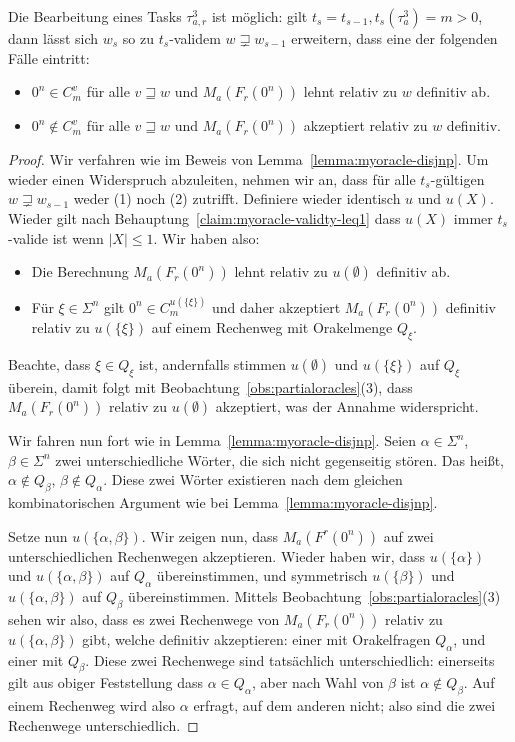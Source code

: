 \begin{lemma}\label{lemma:myoracle-up}
    Die Bearbeitung eines Tasks $\tau^3_{a,r}$ ist möglich: gilt $t_s=t_{s-1}, t_{s}(\tau^3_{a})=m>0$, dann lässt sich $w_{s}$ so zu $t_{s}$-validem $w\sqsupsetneq w_{s-1}$ erweitern, dass eine der folgenden Fälle eintritt:
        \begin{itemize}[nosep,endpenalty=10000]
            \item $0^n\in C_m^v$ für alle $v\sqsupseteq w$ und $M_a(F_r(0^n))$ lehnt relativ zu $w$ definitiv ab.
            \item $0^n\not\in C_m^v$ für alle $v\sqsupseteq w$ und $M_a(F_r(0^n))$ akzeptiert relativ zu $w$ definitiv.
        \end{itemize}
\end{lemma}
\begin{proof}
Wir verfahren wie im Beweis von Lemma~\ref{lemma:myoracle-disjnp}.
Um wieder einen Widerspruch abzuleiten, nehmen wir an, dass für alle $t_{s}$-gültigen $w\sqsupsetneq w_{s-1}$ weder (1) noch (2) zutrifft.
Definiere wieder identisch $u$ und $u(X)$.
Wieder gilt nach Behauptung~\ref{claim:myoracle-validty-leq1} dass $u(X)$ immer $t_{s}$-valide ist wenn $|X|\leq 1$.
Wir haben also:
\begin{itemize}[nosep]
    \item Die Berechnung $M_a(F_r(0^n))$ lehnt relativ zu $u(\emptyset)$ definitiv ab.
    \item Für $\xi\in \Sigma^{n}$ gilt $0^n\in C_m^{u(\{\xi\})}$ und daher akzeptiert $M_a(F_r(0^n))$ definitiv relativ zu $u(\{\xi\})$ auf einem Rechenweg mit Orakelmenge $Q_\xi$.
\end{itemize}

Beachte, dass $\xi\in Q_\xi$ ist, andernfalls stimmen $u(\emptyset)$ und $u(\{\xi\})$ auf $Q_\xi$ überein, damit folgt mit Beobachtung~\ref{obs:partialoracles}(3), dass $M_a(F_r(0^n))$ relativ zu $u(\emptyset)$ akzeptiert, was der Annahme widerspricht.

Wir fahren nun fort wie in Lemma~\ref{lemma:myoracle-disjnp}.
Seien $\alpha\in\Sigma^{n}$, $\beta\in\Sigma^{n}$ zwei unterschiedliche Wörter, die sich nicht gegenseitig stören. Das heißt, $\alpha\not\in Q_\beta$, $\beta\not\in Q_\alpha$.
Diese zwei Wörter existieren nach dem gleichen kombinatorischen Argument wie bei Lemma~\ref{lemma:myoracle-disjnp}.

Setze nun $u(\{\alpha, \beta\})$. Wir zeigen nun, dass $M_a(F^r(0^n))$ auf zwei unterschiedlichen Rechenwegen akzeptieren.
Wieder haben wir, dass $u(\{\alpha\})$ und $u(\{\alpha, \beta\})$ auf $Q_\alpha$ übereinstimmen, und symmetrisch $u(\{\beta\})$ und $u(\{\alpha, \beta\})$ auf $Q_\beta$ übereinstimmen.
Mittels Beobachtung~\ref{obs:partialoracles}(3) sehen wir also, dass es zwei Rechenwege von $M_a(F_r(0^n))$ relativ zu $u(\{\alpha, \beta\})$ gibt, welche definitiv akzeptieren: einer mit Orakelfragen $Q_\alpha$, und einer mit $Q_\beta$.
Diese zwei Rechenwege sind tatsächlich unterschiedlich:
einerseits gilt aus obiger Feststellung dass $\alpha\in Q_\alpha$, aber nach Wahl von $\beta$ ist $\alpha\not\in Q_\beta$. Auf einem Rechenweg wird also $\alpha$ erfragt, auf dem anderen nicht; also sind die zwei Rechenwege unterschiedlich.



\end{proof}
